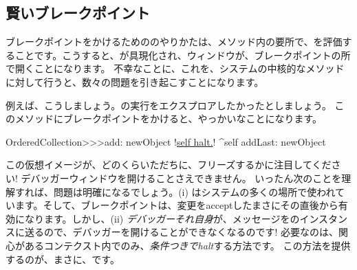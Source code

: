 \documentclass[a4paper,10pt,twoside]{book}
\begin{document}
\subsection{賢いブレークポイント}

ブレークポイントをかけるための\st{}のやりかたは、メソッド内の要所で、を評価することです。こうすると、が具現化され、ウィンドウが、ブレークポイントの所で開くことになります。
不幸なことに、これを、システムの中核的なメソッドに対して行うと、数々の問題を引き起こすことになります。

例えば、こうしましょう。の実行をエクスプロアしたかったとしましょう。
このメソッドにブレークポイントをかけると、やっかいなことになります。

\begin{code}{}
OrderedCollection>>>add: newObject
	!\underline{self halt.}!
	^self addLast: newObject
\end{code}

この仮想イメージが、どのくらいただちに、フリーズするかに注目してください! デバッガーウィンドウを開けることさえできません。
いったん次のことを理解すれば、問題は明確になるでしょう。(i) はシステムの多くの場所で使われています。そして、ブレークポイントは、変更をacceptしたまさにその直後から有効になります。しかし、(ii) \emph{デバッガーそれ自身}が、メッセージをのインスタンスに送るので、デバッガーを開けることができなくなるのです!
必要なのは、関心があるコンテクスト内でのみ、\emph{条件つきでhalt}する方法です。
この方法を提供するのが、まさに、です。
\end{document}
